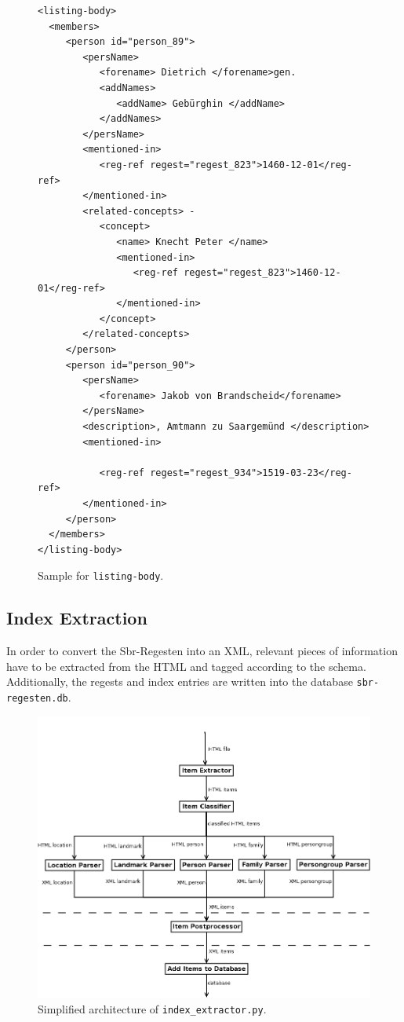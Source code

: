 \begin{figure}[H]
\centering
\begin{verbatim}
<listing-body>
  <members>
     <person id="person_89">
        <persName>
           <forename> Dietrich </forename>gen.
           <addNames>
              <addName> Gebürghin </addName>
           </addNames>
        </persName>
        <mentioned-in>
           <reg-ref regest="regest_823">1460-12-01</reg-ref>
        </mentioned-in>
        <related-concepts> -
           <concept>
              <name> Knecht Peter </name>
              <mentioned-in>
                 <reg-ref regest="regest_823">1460-12-01</reg-ref>
              </mentioned-in>
           </concept>
        </related-concepts>
     </person>
     <person id="person_90">
        <persName>
           <forename> Jakob von Brandscheid</forename>
        </persName>
        <description>, Amtmann zu Saargemünd </description>
        <mentioned-in>

           <reg-ref regest="regest_934">1519-03-23</reg-ref>
        </mentioned-in>
     </person>
  </members>
</listing-body>
\end{verbatim}
\label{fig:listing-body-xml}
\caption{Sample for \texttt{listing-body}.}
\end{figure}


\subsection{Index Extraction}
In order to convert the Sbr-Regesten into an XML, relevant pieces of information have to be extracted from the HTML and tagged according to the schema. Additionally, the regests and index entries are written into the database \texttt{sbr-regesten.db}.


\begin{figure}[h]
  \centering
  \includegraphics[scale=0.5]{img/index-extractor}
  \caption{Simplified architecture of \texttt{index\_extractor.py}.}
  \label{fig:index-extractor}
\end{figure}

